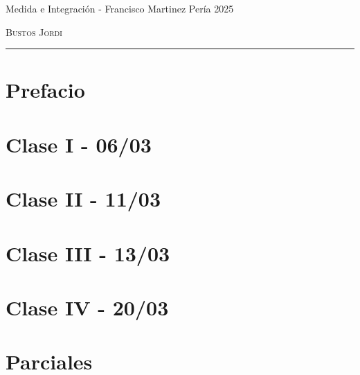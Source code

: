 \documentclass[12pt,a4paper]{book}
\begin{document}
\renewcommand{\contentsname}{\vspace{0cm} Contenido \vspace{-2cm}}

\begin{titlepage}
    \vspace*{2cm}

    \noindent
    \vspace*{0.5cm}

    \vspace{1.5cm}
    \epigraph{Medida e Integración - Francisco Martinez Pería 2025}%
    {\textsc{Bustos Jordi}}
    \null\vfill
    \vspace*{1cm}
    \noindent
    \hfill
    \begin{minipage}{0.7\linewidth}
        \begin{flushright}
            \printauthor
        \end{flushright}
    \end{minipage}
    \begin{minipage}{0.02\linewidth}
        \rule{1pt}{70pt}
    \end{minipage}
    \titlepagedecoration
\end{titlepage}

\let\cleardoublepage=\clearpage
\tableofcontents
\blankpage

\chapter*{Prefacio}

\newpage\thispagestyle{empty}\blankpage

\chapter{Clase I - 06/03 }

\newpage\thispagestyle{empty}\blankpage

\chapter{Clase II - 11/03 }

\newpage\thispagestyle{empty}\blankpage

\chapter{Clase III - 13/03 }

\newpage\thispagestyle{empty}\blankpage

\chapter{Clase IV - 20/03 }

\newpage\thispagestyle{empty}\blankpage

\chapter{Parciales}


\blankpage



\nocite{*}
\end{document}
